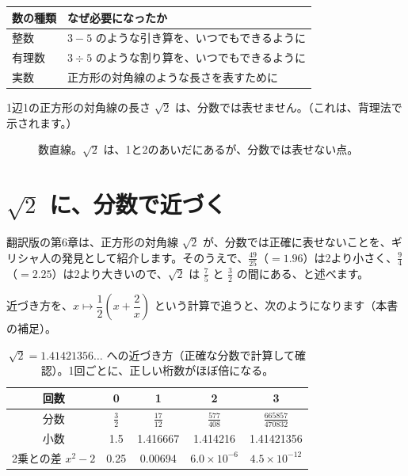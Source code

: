 \documentclass[a4paper,11pt,openany]{ltjsbook}
\begin{document}
\begin{center}
\begin{tabular}{ll}
\toprule
数の種類 & なぜ必要になったか\\
\midrule
整数 & $3-5$ のような引き算を、いつでもできるように\\
有理数 & $3\div5$ のような割り算を、いつでもできるように\\
実数 & 正方形の対角線のような長さを表すために\\
\bottomrule
\end{tabular}
\end{center}

1辺1の正方形の対角線の長さ $\sqrt2$ は、分数では表せません。（これは、背理法で示されます。）

\begin{figure}[htbp]
\centering
{}
\caption{数直線。$\sqrt2$ は、1と2のあいだにあるが、分数では表せない点。}
\end{figure}


\section{$\sqrt2$ に、分数で近づく}

翻訳版の第6章は、正方形の対角線 $\sqrt2$ が、分数では正確に表せないことを、ギリシャ人の発見として紹介します。そのうえで、$\tfrac{49}{25}$（$=1.96$）は2より小さく、$\tfrac94$（$=2.25$）は2より大きいので、$\sqrt2$ は $\tfrac75$ と $\tfrac32$ の間にある、と述べます。

近づき方を、$x\mapsto\dfrac12\left(x+\dfrac2x\right)$ という計算で追うと、次のようになります（本書の補足）。

\begin{table}[htbp]
\centering
\begin{tabular}{c|cccc}
\toprule
回数 & 0 & 1 & 2 & 3\\
\midrule
分数 & $\tfrac32$ & $\tfrac{17}{12}$ & $\tfrac{577}{408}$ & $\tfrac{665857}{470832}$\\
小数 & 1.5 & 1.416667 & 1.414216 & 1.41421356\\
2乗との差 $x^2-2$ & 0.25 & 0.00694 & $6.0\times10^{-6}$ & $4.5\times10^{-12}$\\
\bottomrule
\end{tabular}
\caption{$\sqrt2=1.41421356\ldots$ への近づき方（正確な分数で計算して確認）。1回ごとに、正しい桁数がほぼ倍になる。}
\end{table}
\end{document}
